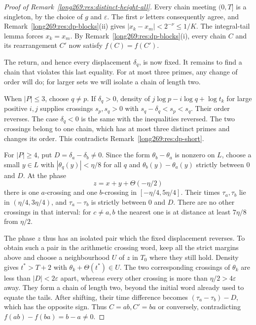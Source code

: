 \documentclass[11pt]{article}
\theoremstyle{remark}
\theoremstyle{plain}
\begin{document}
\begin{proof}[Proof of Remark~\ref{long269:res:distinct-height-all}]
Every chain meeting $(0,T]$ is a singleton, by the choice of $g$ and
$\varepsilon$. The first $\nu$ letters consequently agree, and
Remark~\ref{long269:res:dp-blocks}(ii) gives
$|x_k-x_m|<2^{-\nu}\le1/K$. The integral-tail lemma forces $x_k=x_m$.
By Remark~\ref{long269:res:dp-blocks}(i), every chain $C$ and its rearrangement $C'$
now satisfy $f(C)=f(C')$.

The return, and hence every displacement $\delta_q$, is now fixed.
It remains to find a chain that violates this last equality. For at
most three primes, any change of order will do; for larger sets we
will isolate a chain of length two.

When $|P|\le3$, choose $q\ne p$. If $\delta_q>0$, density of
$j\log p-i\log q+\log t_k$ for large positive $i,j$ supplies crossings
$s_p,s_q>0$ with $s_q-\delta_q<s_p<s_q$. Their order reverses. The case
$\delta_q<0$ is the same with the inequalities reversed. The two crossings
belong to one chain, which has at most three distinct primes and changes
its order. This contradicts Remark~\ref{long269:res:dp-short}.

For $|P|\ge4$, put $D=\delta_a-\delta_b\ne0$. Since the form
$\theta_b-\theta_a$ is nonzero on $L$, choose a small $y\in L$ with
$|\theta_q(y)|<\eta/8$ for all $q$ and
$\theta_b(y)-\theta_a(y)$ strictly between $0$ and $D$.
At the phase
\[
 z=x+y+\Theta(-\eta/2)
\]
there is one $a$-crossing and one $b$-crossing in
$[-\eta/4,5\eta/4]$. Their times $\tau_a,\tau_b$ lie in
$(\eta/4,3\eta/4)$, and $\tau_a-\tau_b$ is strictly between $0$ and $D$.
There are no other crossings in that interval: for $c\ne a,b$ the nearest
one is at distance at least $7\eta/8$ from $\eta/2$.

The phase $z$ thus has an isolated pair which the fixed displacement
reverses. To obtain such a pair in the arithmetic crossing word, keep
all the strict margins above and choose a neighbourhood $U$ of $z$ in
$T_0$ where they still hold. Density gives $t^*>T+2$ with
$\theta_k+\Theta(t^*)\in U$. The two corresponding crossings of
$\theta_k$ are less than $|D|<2\varepsilon$ apart, whereas every other
crossing is more than $\eta/2>4\varepsilon$ away. They form a chain of
length two, beyond the initial word already used to equate the tails.
After shifting, their time difference becomes
$(\tau_a-\tau_b)-D$, which has the opposite sign. Thus $C=ab,C'=ba$
or conversely, contradicting $f(ab)-f(ba)=b-a\ne0$.
\end{proof}
\end{document}
